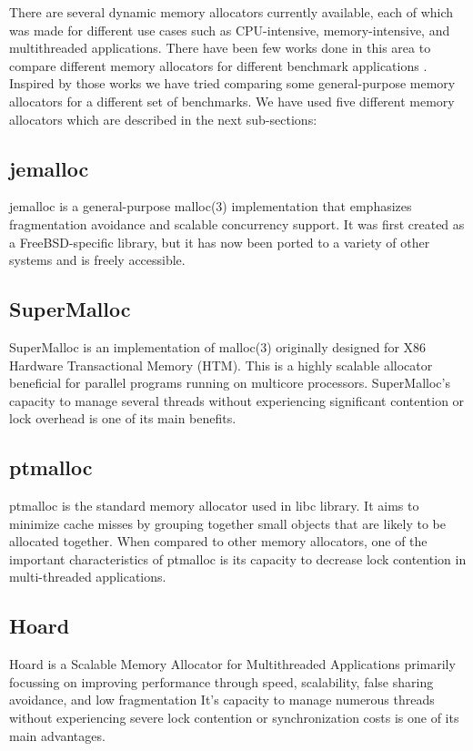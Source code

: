 \documentclass[sigplan,screen]{acmart}
\begin{document}
There are several dynamic memory allocators currently available, each of which was made for different use cases such as CPU-intensive, memory-intensive, and multithreaded applications. There have been few works done in this area to compare different memory allocators for different benchmark applications \cite{berger2001composing}. Inspired by those works we have tried comparing some general-purpose memory allocators for a different set of benchmarks. We have used five different memory allocators which are described in the next sub-sections:

\subsection{jemalloc}
jemalloc is a general-purpose malloc(3) implementation that emphasizes fragmentation avoidance and scalable concurrency support.  It was first created as a FreeBSD-specific library, but it has now been ported to a variety of other systems and is freely accessible\cite{evans2006scalable}.

\subsection{SuperMalloc}
SuperMalloc is an implementation of malloc(3) originally designed for X86 Hardware Transactional Memory (HTM)\cite{kuszmaul2015supermalloc}. This is a highly scalable allocator beneficial for parallel programs running on multicore processors. SuperMalloc's capacity to manage several threads without experiencing significant contention or lock overhead is one of its main benefits.

\subsection{ptmalloc}
ptmalloc is the standard memory allocator used in libc library. It aims to minimize cache misses by grouping together small objects that are likely to be allocated together. When compared to other memory allocators, one of the important characteristics of ptmalloc is its capacity to decrease lock contention in multi-threaded applications.

\subsection{Hoard}
Hoard is a Scalable Memory Allocator for Multithreaded Applications primarily focussing on improving performance through speed, scalability, false sharing avoidance, and low fragmentation \cite{berger2000hoard} It's capacity to manage numerous threads without experiencing severe lock contention or synchronization costs is one of its main advantages.
\end{document}
